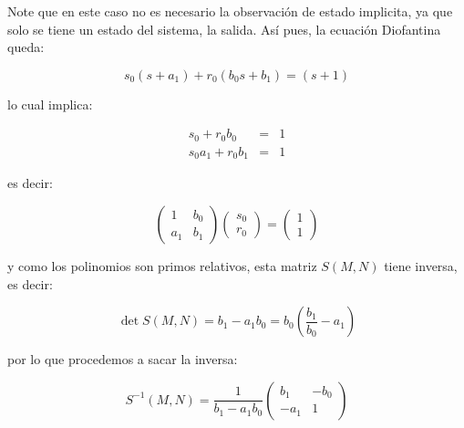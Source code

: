             Note que en este caso no es necesario la observación de estado implicita, ya que solo se tiene un estado del sistema, la salida.
            Así pues, la ecuación Diofantina queda:

            \begin{equation*}
                s_0 (s + a_1) + r_0 (b_0 s + b_1) = (s + 1)
            \end{equation*}

            lo cual implica:

            \begin{eqnarray*}
                s_0 + r_0 b_0 & = & 1 \\
                s_0 a_1 + r_0 b_1 & = & 1
            \end{eqnarray*}

            es decir:

            \begin{equation*}
                \begin{pmatrix}
                    1 & b_0 \\
                    a_1 & b_1
                \end{pmatrix}
                \begin{pmatrix}
                    s_0 \\
                    r_0
                \end{pmatrix} =
                \begin{pmatrix}
                    1 \\
                    1
                \end{pmatrix}
            \end{equation*}

            y como los polinomios son primos relativos, esta matriz $S(M, N)$ tiene inversa, es decir:

            \begin{equation*}
                \det{S(M, N)} = b_1 - a_1 b_0 = b_0 \left( \frac{b_1}{b_0} - a_1 \right)
            \end{equation*}

            por lo que procedemos a sacar la inversa:

            \begin{equation*}
                S^{-1}(M, N) = \frac{1}{b_1 - a_1 b_0}
                \begin{pmatrix}
                    b_1 & -b_0 \\
                    -a_1 & 1
                \end{pmatrix}
            \end{equation*}

